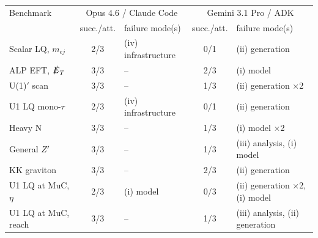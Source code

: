 \begin{tabular}{lclcl}
\toprule
Benchmark & \multicolumn{2}{c}{Opus 4.6 / Claude Code} & \multicolumn{2}{c}{Gemini 3.1 Pro / ADK} \\
 & succ./att. & failure mode(s) & succ./att. & failure mode(s) \\
\midrule
Scalar LQ, $m_{ej}$ & 2/3 & (iv) infrastructure & 0/1 & (ii) generation \\
ALP EFT, $\slashed{E}_T$ & 3/3 & -- & 2/3 & (i) model \\
U(1)$'$ scan & 3/3 & -- & 1/3 & (ii) generation $\times$2 \\
U1 LQ mono-$\tau$ & 2/3 & (iv) infrastructure & 0/1 & (ii) generation \\
Heavy N & 3/3 & -- & 1/3 & (i) model $\times$2 \\
General $Z'$ & 3/3 & -- & 1/3 & (iii) analysis, (i) model \\
KK graviton & 3/3 & -- & 2/3 & (ii) generation \\
U1 LQ at MuC, $\eta$ & 2/3 & (i) model & 0/3 & (ii) generation $\times$2, (i) model \\
U1 LQ at MuC, reach & 3/3 & -- & 1/3 & (iii) analysis, (ii) generation \\
\bottomrule
\end{tabular}
